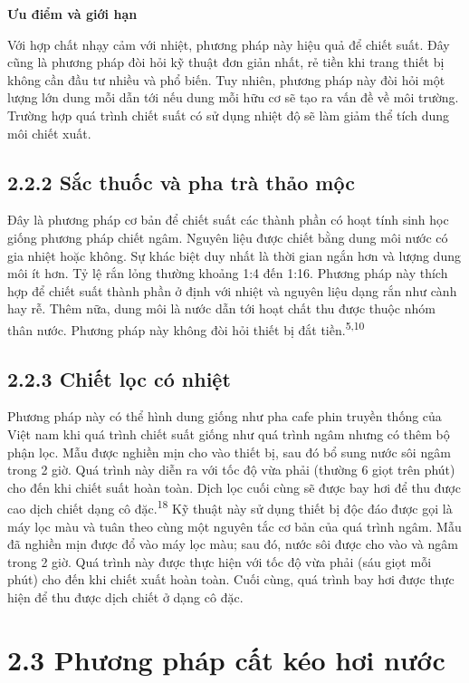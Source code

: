 \documentclass[
  twocolumn,
  landscape]{report}
\begin{document}
\textbf{Ưu điểm và giới hạn}

Với hợp chất nhạy cảm với nhiệt, phương pháp này hiệu quả để chiết suất.
Đây cũng là phương pháp đòi hỏi kỹ thuật đơn giản nhất, rẻ tiền khi
trang thiết bị không cần đầu tư nhiều và phổ biến. Tuy nhiên, phương
pháp này đòi hỏi một lượng lớn dung mỗi dẫn tới nếu dung mỗi hữu cơ sẽ
tạo ra vấn đề về môi trường. Trường hợp quá trình chiết suất có sử dụng
nhiệt độ sẽ làm giảm thể tích dung môi chiết xuất.

\subsection{2.2.2 Sắc thuốc và pha trà thảo
mộc}\label{sux1eafc-thuux1ed1c-vuxe0-pha-truxe0-thux1ea3o-mux1ed9c}

Đây là phương pháp cơ bản để chiết suất các thành phần có hoạt tính sinh
học giống phương pháp chiết ngâm. Nguyên liệu được chiết bằng dung môi
nước có gia nhiệt hoặc không. Sự khác biệt duy nhất là thời gian ngắn
hơn và lượng dung môi ít hơn. Tỷ lệ rắn lỏng thường khoảng 1:4 đến 1:16.
Phương pháp này thích hợp để chiết suất thành phần ở định với nhiệt và
nguyên liệu dạng rắn như cành hay rễ. Thêm nữa, dung môi là nước dẫn tới
hoạt chất thu được thuộc nhóm thân nước. Phương pháp này không đòi hỏi
thiết bị đắt tiền.\textsuperscript{5,10}

\subsection{2.2.3 Chiết lọc có
nhiệt}\label{chiux1ebft-lux1ecdc-cuxf3-nhiux1ec7t}

Phương pháp này có thể hình dung giống như pha cafe phin truyền thống
của Việt nam khi quá trình chiết suất giống như quá trình ngâm nhưng có
thêm bộ phận lọc. Mẫu được nghiền mịn cho vào thiết bị, sau đó bổ sung
nước sôi ngâm trong 2 giờ. Quá trình này diễn ra với tốc độ vừa phải
(thường 6 giọt trên phút) cho đến khi chiết suất hoàn toàn. Dịch lọc
cuối cùng sẽ được bay hơi để thu được cao dịch chiết dạng cô
đặc.\textsuperscript{18} Kỹ thuật này sử dụng thiết bị độc đáo được gọi
là máy lọc màu và tuân theo cùng một nguyên tắc cơ bản của quá trình
ngâm. Mẫu đã nghiền mịn được đổ vào máy lọc màu; sau đó, nước sôi được
cho vào và ngâm trong 2 giờ. Quá trình này được thực hiện với tốc độ vừa
phải (sáu giọt mỗi phút) cho đến khi chiết xuất hoàn toàn. Cuối cùng,
quá trình bay hơi được thực hiện để thu được dịch chiết ở dạng cô đặc.

\section{2.3 Phương pháp cất kéo hơi
nước}\label{phux1b0ux1a1ng-phuxe1p-cux1ea5t-kuxe9o-hux1a1i-nux1b0ux1edbc}
\end{document}
